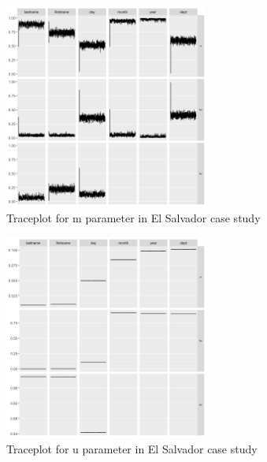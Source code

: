 \documentclass[12pt,letterpaper]{article}
\newcommand{\1}[1]{\mathbb{I}\!\left[#1\right]} %
\begin{document}
\begin{figure}[h]
\begin{center}
\includegraphics[width=0.6\textwidth]{../notes/figures/el_salvador/m_trace} 
\caption{Traceplot for m parameter in El Salvador case study}\label{fig:m_trace}
\end{center}
\end{figure}

\begin{figure}[h]
\begin{center}
\includegraphics[width=0.6\textwidth]{../notes/figures/el_salvador/u_trace} 
\caption{Traceplot for u parameter in El Salvador case study}\label{fig:u_trace}
\end{center}
\end{figure}

\clearpage

\bigskip


{
\footnotesize

}
\end{document}
